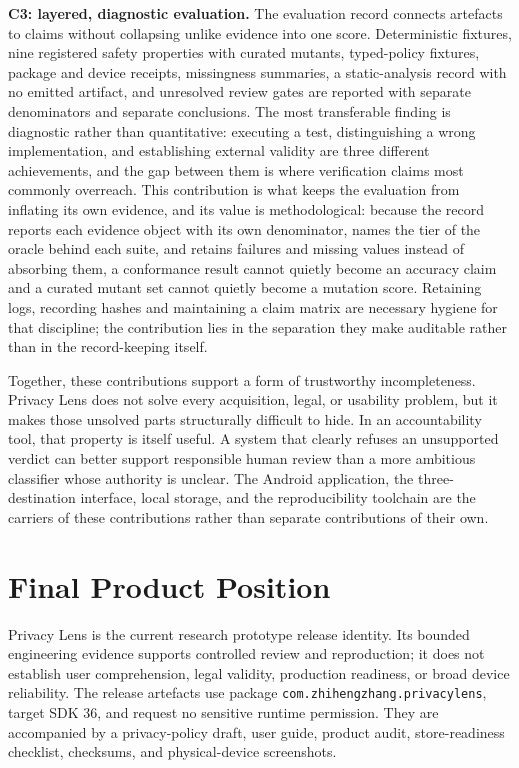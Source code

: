\textbf{C3: layered, diagnostic evaluation.} The evaluation record connects artefacts to claims without collapsing unlike evidence into one score. Deterministic fixtures, nine registered safety properties with curated mutants, typed-policy fixtures, package and device receipts, missingness summaries, a static-analysis record with no emitted artifact, and unresolved review gates are reported with separate denominators and separate conclusions. The most transferable finding is diagnostic rather than quantitative: executing a test, distinguishing a wrong implementation, and establishing external validity are three different achievements, and the gap between them is where verification claims most commonly overreach. This contribution is what keeps the evaluation from inflating its own evidence, and its value is methodological: because the record reports each evidence object with its own denominator, names the tier of the oracle behind each suite, and retains failures and missing values instead of absorbing them, a conformance result cannot quietly become an accuracy claim and a curated mutant set cannot quietly become a mutation score. Retaining logs, recording hashes and maintaining a claim matrix are necessary hygiene for that discipline; the contribution lies in the separation they make auditable rather than in the record-keeping itself.

Together, these contributions support a form of trustworthy incompleteness. Privacy Lens does not solve every acquisition, legal, or usability problem, but it makes those unsolved parts structurally difficult to hide. In an accountability tool, that property is itself useful. A system that clearly refuses an unsupported verdict can better support responsible human review than a more ambitious classifier whose authority is unclear. The Android application, the three-destination interface, local storage, and the reproducibility toolchain are the carriers of these contributions rather than separate contributions of their own.

\section{Final Product Position}

Privacy Lens \PrivacyLensVersion{} is the current research prototype release identity. Its bounded engineering evidence supports controlled review and reproduction; it does not establish user comprehension, legal validity, production readiness, or broad device reliability. The release artefacts use package \texttt{com.zhihengzhang.privacylens}, target SDK 36, and request no sensitive runtime permission. They are accompanied by a privacy-policy draft, user guide, product audit, store-readiness checklist, checksums, and physical-device screenshots.

